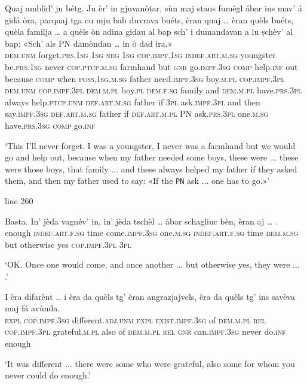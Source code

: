 \begin{linenumbers}
	\gll Quaj amblid’ ju bétg. Ju èr’ in gjuvanòtar, sùn maj staus fumégl ábar ins mav’ á gidá òra, parquaj tga cu mju bab duvrava buéts, èran quaj … èran quèls buéts, quèla familja … a quèls òn adina gidau al bap sch’ i dumandavan a lu ṣchèv’ al bap: «Sch’ als \textsc{PN} damòndan … in ò dad ira.»\\
	\textsc{dem.unm} forget.\textsc{prs.1sg} \textsc{1sg} \textsc{neg} \textsc{1sg} \textsc{cop.impf.1sg} \textsc{indef.art.m.sg} youngster be.\textsc{prs.1sg} never \textsc{cop.ptcp.m.sg} farmhand but \textsc{gnr} go.\textsc{impf.3sg} \textsc{comp} help.\textsc{inf} out because \textsc{comp} when \textsc{poss.1sg.m.sg} father need.\textsc{impf.3sg} boy.\textsc{m.pl} \textsc{cop.impf.3pl} \textsc{dem.unm} {} \textsc{cop.impf.3pl} \textsc{dem.m.pl} boy.\textsc{pl} \textsc{dem.f.sg} family {} and \textsc{dem.m.pl} have.\textsc{prs.3pl} always help.\textsc{ptcp.unm} \textsc{def.art.m.sg} father if \textsc{3pl} ask.\textsc{impf.3pl} and then say.\textsc{impf.3sg} \textsc{def.art.m.sg} father if \textsc{def.art.m.pl} \textsc{PN} ask.\textsc{prs.3pl} {} one.\textsc{m.sg} have.\textsc{prs.3sg} \textsc{comp} go.\textsc{inf}\\
\end{linenumbers}
\medskip
\glt `This I'll never forget. I was a youngster, I never was a farmhand but we would go and help out, because when my father needed some boys, these were ... these were those boys, that family ... and these always helped my father if they asked them, and then my father used to say: «If the \texttt{PN} ask ... one has to go.»'
\medskip

line 260


\begin{linenumbers}
	\gll Basta. In' jèda vagnév’ in, in' jèda tschèl … ábar schagliuc bèn, èran aj … .   \\
	enough \textsc{indef.art.f.sg} time come.\textsc{impf.3sg} one.\textsc{m.sg} \textsc{indef.art.f.sg} time \textsc{dem.m.sg} {} but otherwise yes \textsc{cop.impf.3pl} \textsc{3pl}\\
\end{linenumbers}
\medskip
\glt `OK. Once one would come, and once another ... but otherwise yes, they were ... .'
\medskip

\begin{linenumbers}
	\gll I èra difarènt … i èra da quèls tg’ èran angrazjajvels, èra da quèls tg’ ins savèva maj fá avùnda.   \\
\textsc{expl} \textsc{cop.impf.3sg} different.\textsc{adj.unm} {} \textsc{expl} \textsc{exist.impf.3sg} of \textsc{dem.m.pl} \textsc{rel} \textsc{cop.impf.3pl} grateful.\textsc{m.pl} also of \textsc{dem.m.pl} \textsc{rel} \textsc{gnr} can.\textsc{impf.3sg} never do.\textsc{inf} enough\\
\end{linenumbers}
\medskip
\glt `It was different ... there were some who were grateful, also some for whom you never could do enough.'
\medskip

